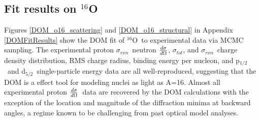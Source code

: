 \documentclass[twocolumn,secnumarabic,amssymb, nobibnotes, aps, prl,
superscriptaddress, nobalancelastpage, draft]{revtex4}
\newcommand{\tot}{\ensuremath{\sigma_{tot}}}
\newcommand{\rxn}{\ensuremath{\sigma_{rxn}}}
\newcommand{\el}{\ensuremath{\frac{\lowercase{d}\sigma}{\lowercase{d}\Omega}}}
\newcommand{\oSix}{\ensuremath{^{16}}O}
\newcommand{\pOne}{p\ensuremath{_{1/2}}}
\newcommand{\dFive}{d\ensuremath{_{5/2}}}
\begin{document}


\subsection{Fit results on $^{16}$O}
Figures \ref{DOM_o16_scattering} and \ref{DOM_o16_structural} in Appendix
\ref{DOMFitResults} show the DOM fit of \oSix\ to experimental data via
MCMC sampling. The experimental proton \rxn\, neutron \el, \tot, 
and \rxn\, charge density distribution, RMS charge radius, binding energy per nucleon,
and \pOne\ and \dFive\ single-particle energy data are all well-reproduced,
suggesting that the DOM is a effect tool for modeling nuclei as light as A=16.
Almost all experimental proton \el\ data are recovered by the DOM
calculations with the exception of the location and magnitude of the diffraction
minima at backward angles, a regime known to be challenging from past
optical model analyses.
\end{document}
